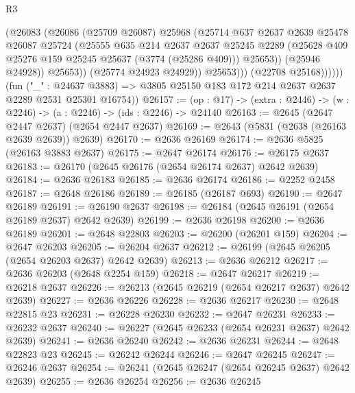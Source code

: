 \begin{lexlean}{R3}
\begin{coremodule}
                          (@26083
                            (@26086
                              (@25709 @26087)
                              @25968
                              (@25714
                                @637
                                @2637
                                @2639
                                @25478
                                @26087
                                @25724
                                (@25555
                                  @635
                                  @214
                                  @2637
                                  @2637
                                  @25245
                                  @2289
                                  (@25628 @409 @25276 @159 @25245 @25637 (@3774 (@25286 @409)))
                                  @25653))
                              (@25946 @24928))
                            @25653))
                        (@25774 @24923 @24929))
                      @25653)))
                (@22708 @25168))))))
      (fun ("_" : @24637 @3883) =>
      @3805 @25150 @183 @172 @214 @2637 @2637 @2289 @2531 @25301 @16754))
@26157 := (op : @17) -> (extra : @2446) -> (w : @2246) -> (a : @2246) -> (ids : @2246) -> @24140
@26163 := @2645 (@2647 @2447 @2637) (@2654 @2447 @2637)
@26169 := @2643 (@5831 (@2638 (@26163 @2639 @2639)) @2639)
@26170 := @2636 @26169
@26174 := @2636 @5825 (@26163 @3883 @2637)
@26175 := @2647 @26174
@26176 := @26175 @2637
@26183 := @26170 (@2645 @26176 (@2654 @26174 @2637) @2642 @2639)
@26184 := @2636 @26183
@26185 := @2636 @26174
@26186 := @2252 @2458
@26187 := @2648 @26186
@26189 := @26185 (@26187 @693)
@26190 := @2647 @26189
@26191 := @26190 @2637
@26198 := @26184 (@2645 @26191 (@2654 @26189 @2637) @2642 @2639)
@26199 := @2636 @26198
@26200 := @2636 @26189
@26201 := @2648 @22803
@26203 := @26200 (@26201 @159)
@26204 := @2647 @26203
@26205 := @26204 @2637
@26212 := @26199 (@2645 @26205 (@2654 @26203 @2637) @2642 @2639)
@26213 := @2636 @26212
@26217 := @2636 @26203 (@2648 @2254 @159)
@26218 := @2647 @26217
@26219 := @26218 @2637
@26226 := @26213 (@2645 @26219 (@2654 @26217 @2637) @2642 @2639)
@26227 := @2636 @26226
@26228 := @2636 @26217
@26230 := @2648 @22815 @23
@26231 := @26228 @26230
@26232 := @2647 @26231
@26233 := @26232 @2637
@26240 := @26227 (@2645 @26233 (@2654 @26231 @2637) @2642 @2639)
@26241 := @2636 @26240
@26242 := @2636 @26231
@26244 := @2648 @22823 @23
@26245 := @26242 @26244
@26246 := @2647 @26245
@26247 := @26246 @2637
@26254 := @26241 (@2645 @26247 (@2654 @26245 @2637) @2642 @2639)
@26255 := @2636 @26254
@26256 := @2636 @26245

\end{coremodule}
\end{lexlean}
